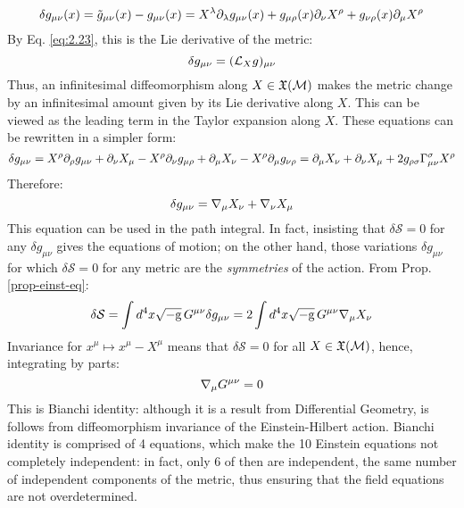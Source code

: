 \begin{equation*}
  \delta g_{\mu \nu}(x) = \tilde{g}_{\mu \nu}(x) - g_{\mu \nu}(x) = X^\lambda \partial_\lambda g_{\mu \nu}(x) + g_{\mu \rho}(x) \partial_\nu X^\rho + g_{\nu \rho}(x) \partial_\mu X^\rho
\end{equation*}
By Eq. \ref{eq:2.23}, this is the Lie derivative of the metric:
\begin{equation}
  \delta g_{\mu \nu} = (\mathcal{L}_X g)_{\mu \nu}
  \label{eq:4.11}
\end{equation}
Thus, an infinitesimal diffeomorphism along $ X \in \mathfrak{X}(\mathcal{M}) $ makes the metric change by an infinitesimal amount given by its Lie derivative along $ X $. This can be viewed as the leading term in the Taylor expansion along $ X $. These equations can be rewritten in a simpler form:
\begin{equation*}
  \delta g_{\mu \nu} = X^\rho \partial_\rho g_{\mu \nu} + \partial_\nu X_\mu - X^\rho \partial_\nu g_{\mu \rho} + \partial_\mu X_\nu - X^\rho \partial_\mu g_{\nu \rho} = \partial_\mu X_\nu + \partial_\nu X_\mu + 2 g_{\rho \sigma} \Gamma^\sigma_{\mu \nu} X^\rho
\end{equation*}
Therefore:
\begin{equation}
  \delta g_{\mu \nu} = \nabla_\mu X_\nu + \nabla_\nu X_\mu
  \label{eq:4.12}
\end{equation}
This equation can be used in the path integral. In fact, insisting that $ \delta \mathcal{S} = 0 $ for any $ \delta g_{\mu \nu} $ gives the equations of motion; on the other hand, those variations $ \delta g_{\mu \nu} $ for which $ \delta \mathcal{S} = 0 $ for any metric are the \textit{symmetries} of the action. From Prop. \ref{prop-einst-eq}:
\begin{equation*}
  \delta \mathcal{S} = \int d^4 x \sqrt{-\mathrm{g}}\, G^{\mu \nu} \delta g_{\mu \nu} = 2 \int d^4 x \sqrt{-\mathrm{g}}\, G^{\mu \nu} \nabla_\mu X_\nu
\end{equation*}
Invariance for $ x^\mu \mapsto x^\mu - X^\mu $ means that $ \delta \mathcal{S} = 0 $ for all $ X \in \mathfrak{X}(\mathcal{M}) $, hence, integrating by parts:
\begin{equation}
  \nabla_\mu G^{\mu \nu} = 0
  \label{eq:4.13}
\end{equation}
This is Bianchi identity: although it is a result from Differential Geometry, is follows from diffeomorphism invariance of the Einstein-Hilbert action. Bianchi identity is comprised of 4 equations, which make the 10 Einstein equations not completely independent: in fact, only 6 of then are independent, the same number of independent components of the metric, thus ensuring that the field equations are not overdetermined.

